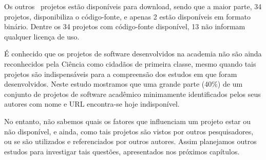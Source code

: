 Os outros \SoftwareDownloadAvailableCount \ projetos estão disponíveis para download, sendo que
a maior parte, 34 projetos, disponibiliza o código-fonte, e apenas 2
estão disponíveis em formato binário.
Dentre os 34 projetos com código-fonte disponível, 13 não informam qualquer
licença de uso.

É conhecido que os projetos de software desenvolvidos na academia não são ainda
reconhecidos pela Ciência como cidadãos de primeira classe, mesmo quando tais
projetos são indispensáveis para a compreensão dos estudos em que foram
desenvolvidos. Neste estudo mostramos que uma grande parte (40\%) de um
conjunto de projetos de software acadêmico minimamente identificados pelos seus
autores com nome e URL encontra-se hoje indisponível.

No entanto, não sabemos quais os fatores que influenciam um projeto estar ou não
disponível, e ainda, como tais projetos são vistos por outros pesquisadores, ou se
são utilizados e referenciados por outros autores. Assim planejamos outros
estudos para investigar tais questões, apresentados nos próximos capítulos.


